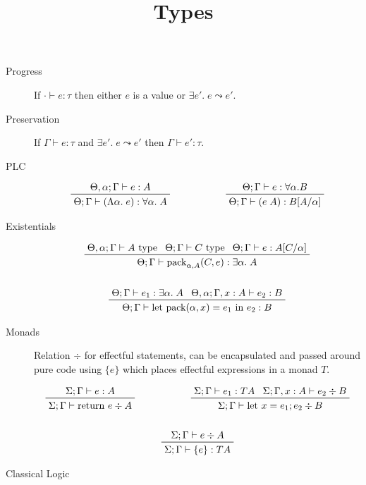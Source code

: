 \documentclass[a4paper,11pt]{article}
\title{\vspace{-2cm}Types\vspace{-1.5cm}}
\author{}
\date{}
\begin{document}
\maketitle

\begin{description}
\item[Progress]\quad If \(\cdot\vdash e : \tau\) then either \(e\) is a value or \(\exists e'.\;e \leadsto e'\).
\item[Preservation]\quad If \(\Gamma\vdash e : \tau\) and \(\exists e'.\;e \leadsto e'\) then \(\Gamma\vdash e' : \tau\).
\item[PLC]
{
    \begin{gather*}
    \prftree[r]{}
    {\Theta,\alpha;\Gamma \vdash e : A}
    {\Theta;\Gamma \vdash (\Lambda\alpha.\;e) : \forall\alpha.\;A}
    \hspace{2cm}
    \prftree[r]{}
    {\Theta;\Gamma \vdash e : \forall\alpha.B}
    {\Theta;\Gamma \vdash (e\;A) : B[A/\alpha]}
    \end{gather*}
} 
\item[Existentials]
{
    \begin{gather*}
    \prftree[r]{}
    {\Theta,\alpha;\Gamma \vdash A \text{ type}}
    {\Theta;\Gamma \vdash C \text{ type}}
    {\Theta;\Gamma \vdash e : A[C/\alpha]}
    {\Theta;\Gamma \vdash \text{pack}_{\alpha,A}(C,e) : \exists \alpha.\;A}
    \\
    \\
    \prftree[r]{}
    {\Theta;\Gamma \vdash e_1 : \exists\alpha.\;A}
    {\Theta,\alpha;\Gamma,x:A \vdash e_2 : B}
    {\Theta;\Gamma \vdash \text{let pack}(\alpha,x) = e_1\text{ in }e_2 : B}
    \end{gather*}
}
\item[Monads]
{\hfill

    Relation \(\div\) for effectful statements, can be encapsulated and passed around pure code using \(\{e\}\) which places effectful expressions in a monad \(T\).

    \begin{gather*}
    \prftree[r]{}
    {\Sigma;\Gamma \vdash e : A}
    {\Sigma;\Gamma \vdash \text{return }e \div A}
    \hspace{2cm}
    \prftree[r]{}
    {\Sigma;\Gamma \vdash e_1 : T A}
    {\Sigma;\Gamma,x:A \vdash e_2 \div B}
    {\Sigma;\Gamma \vdash \text{let }x = e_1; e_2 \div B}
    \\
    \\
    \prftree[r]{}
    {\Sigma;\Gamma \vdash e \div A}
    {\Sigma;\Gamma \vdash \{e\} : T A}
    \end{gather*}
}
\item[Classical Logic]
{\hfill

}
\end{description}
\end{document}
